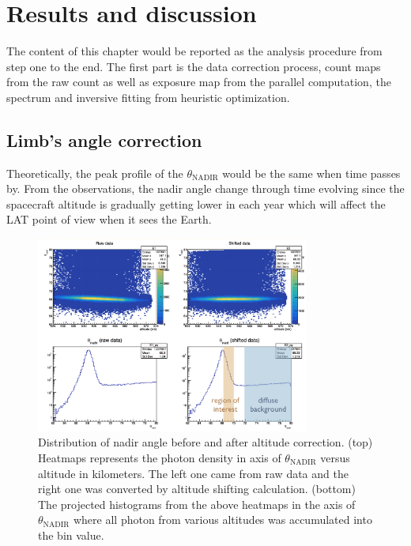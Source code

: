 \chapter{Results and discussion}

The content of this chapter would be reported as the analysis 
procedure from step one to the end. The first part is the data 
correction process, count maps from the raw count as well as 
exposure map from the parallel computation, the spectrum and 
inversive fitting from heuristic optimization.

\section{Limb's angle correction}
Theoretically, the peak profile of the $\theta_\text{NADIR}$ would be
the same when time passes by.
From the observations, the nadir angle change through time 
evolving since the spacecraft altitude is gradually getting lower
in each year which will affect the LAT point of view when it sees 
the Earth.

\begin{figure}[h!]
    \centering
    \includegraphics[width=0.8\textwidth]{content/result_and_discussion/figures/LATShifted.png}
    \caption{
        Distribution of nadir angle before and after altitude correction.
        (top) Heatmaps represents the photon density in axis
        of $\theta_\text{NADIR}$ versus altitude in kilometers.
        The left one came from raw data and the right one was
        converted by altitude shifting calculation.
        (bottom) The projected histograms from the above heatmaps
        in the axis of $\theta_\text{NADIR}$ where all photon
        from various altitudes was accumulated into the bin value.
    }
    \label{fig:lat_nadir_shifted}
\end{figure}


